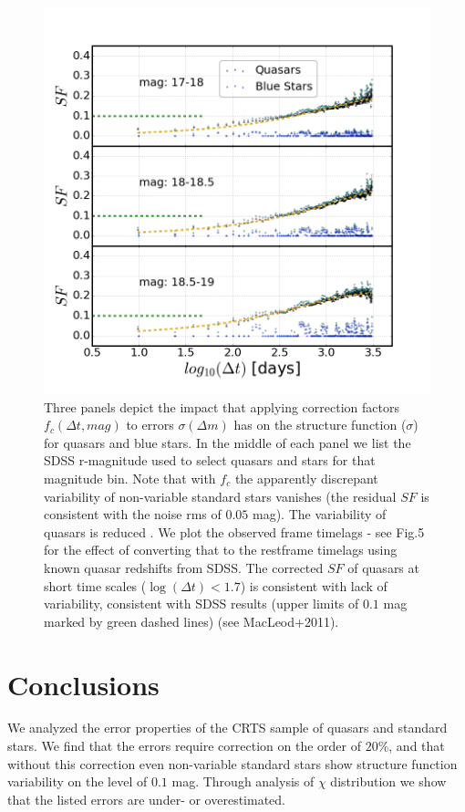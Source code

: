 \documentclass[fleqn,usenatbib]{mnras}  %
\begin{document}
\begin{figure}
\end{figure}



\begin{figure}
\label{fig:4}
 \includegraphics[width=\columnwidth]{Fig_4_SF_QSO_starsB_r_cut.png}
 \caption{Three panels depict the impact that applying correction factors $f_{c}(\Delta t, mag)$ to errors $\sigma(\Delta m)$ has on the structure function ($\sigma$) for quasars and blue stars. In the middle of each panel we list the SDSS r-magnitude used to select quasars and stars for that magnitude bin. Note that with $f_{c}$ the apparently discrepant variability of non-variable standard stars  vanishes (the residual $SF$ is consistent with the noise rms of $0.05$ mag). The variability of quasars is reduced . We plot the observed frame timelags - see Fig.5 for the effect of converting that to the restframe timelags using known quasar redshifts from SDSS. The corrected $SF$ of quasars at short time scales ($\log(\Delta t) < 1.7$) is consistent with lack of variability, consistent with SDSS results (upper limits of $0.1$ mag marked by green dashed lines) (see MacLeod+2011).}
\end{figure}

\section{Conclusions}
We analyzed the error properties of the CRTS sample of quasars and standard stars.  We find that the errors require correction on the order of $20\%$, and that without this correction even non-variable standard stars show structure function variability on the level of $0.1$ mag. Through analysis of $\chi$ distribution we show that the listed errors are under- or overestimated.  
\end{document}
